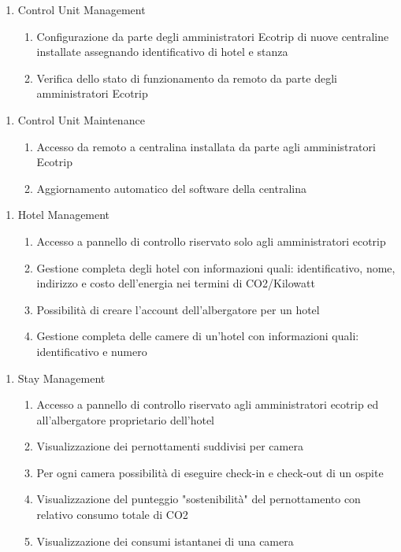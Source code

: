 \begin{enumerate}
    \begin{enumerate}
        \item Control Unit Management
        \begin{enumerate}
            \item Configurazione da parte degli amministratori Ecotrip di nuove centraline installate assegnando identificativo di hotel e stanza
            \item Verifica dello stato di funzionamento da remoto da parte degli amministratori Ecotrip
        \end{enumerate}
    \end{enumerate}

    \begin{enumerate}
        \item Control Unit Maintenance
        \begin{enumerate}
            \item Accesso da remoto a centralina installata da parte agli amministratori Ecotrip
            \item Aggiornamento automatico del software della centralina
        \end{enumerate}
    \end{enumerate}

    \begin{enumerate}
        \item Hotel Management
        \begin{enumerate}
            \item Accesso a pannello di controllo riservato solo agli amministratori ecotrip
            \item Gestione completa degli hotel con informazioni quali: identificativo, nome, indirizzo e costo dell'energia nei termini di CO2/Kilowatt
            \item Possibilità di creare l'account dell'albergatore per un hotel
            \item Gestione completa delle camere di un'hotel con informazioni quali: identificativo e numero
        \end{enumerate}
    \end{enumerate}

    \begin{enumerate}
        \item Stay Management
        \begin{enumerate}
            \item Accesso a pannello di controllo riservato agli amministratori ecotrip ed all'albergatore proprietario dell'hotel
            \item Visualizzazione dei pernottamenti suddivisi per camera
            \item Per ogni camera possibilità di eseguire check-in e check-out di un ospite
            \item Visualizzazione del punteggio "sostenibilità" del pernottamento con relativo consumo totale di CO2
            \item Visualizzazione dei consumi istantanei di una camera
        \end{enumerate}
    \end{enumerate}


\end{enumerate}
